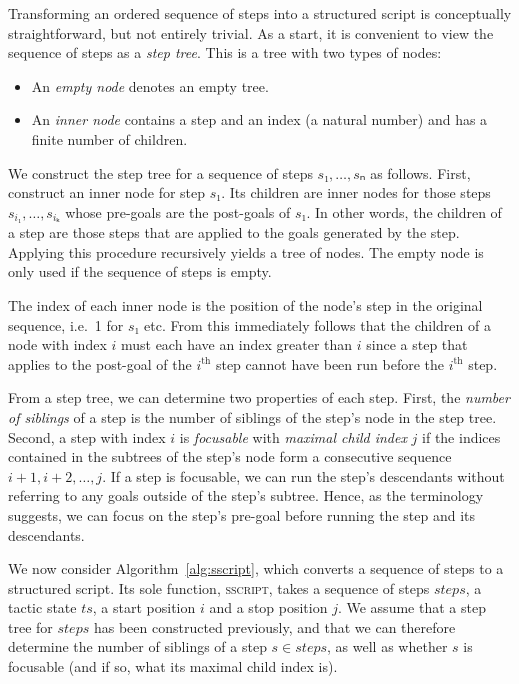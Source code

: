 \documentclass[sigplan,screen]{acmart}
\begin{document}
Transforming an ordered sequence of steps into a structured script is conceptually straightforward, but not entirely trivial.
As a start, it is convenient to view the sequence of steps as a \emph{step tree}.
This is a tree with two types of nodes:
\begin{itemize}
  \item An \emph{empty node} denotes an empty tree.
  \item An \emph{inner node} contains a step and an index (a natural number) and has a finite number of children.
\end{itemize}
We construct the step tree for a sequence of steps $s₁, \dots, sₙ$ as follows.
First, construct an inner node for step $s₁$.
Its children are inner nodes for those steps $s_{i₁}, \dots, s_{iₖ}$ whose pre-goals are the post-goals of $s₁$.
In other words, the children of a step are those steps that are applied to the goals generated by the step.
Applying this procedure recursively yields a tree of nodes.
The empty node is only used if the sequence of steps is empty.

The index of each inner node is the position of the node's step in the original sequence, i.e.\ 1 for $s₁$ etc.
From this immediately follows that the children of a node with index $i$ must each have an index greater than $i$ since a step that applies to the post-goal of the $i^{\text{th}}$ step cannot have been run before the $i^{\text{th}}$ step.

From a step tree, we can determine two properties of each step.
First, the \emph{number of siblings} of a step is the number of siblings of the step's node in the step tree.
Second, a step with index $i$ is \emph{focusable} with \emph{maximal child index} $j$ if the indices contained in the subtrees of the step's node form a consecutive sequence $i+1, i+2, \dots, j$.
If a step is focusable, we can run the step's descendants without referring to any goals outside of the step's subtree.
Hence, as the terminology suggests, we can focus on the step's pre-goal before running the step and its descendants.

We now consider Algorithm~\ref{alg:sscript}, which converts a sequence of steps to a structured script.
Its sole function, \textsc{sscript}, takes a sequence of steps $\mathit{steps}$, a tactic state $\mathit{ts}$, a start position $i$ and a stop position $j$.
We assume that a step tree for $\mathit{steps}$ has been constructed previously, and that we can therefore determine the number of siblings of a step $s ∈ \mathit{steps}$, as well as whether $s$ is focusable (and if so, what its maximal child index is).
\end{document}
